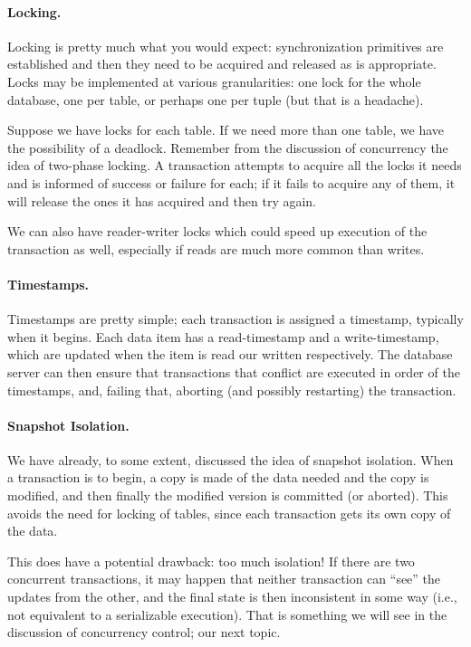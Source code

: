 \paragraph{Locking.} Locking is pretty much what you would expect: synchronization primitives are established and then they need to be acquired and released as is appropriate. Locks may be implemented at various granularities: one lock for the whole database, one per table, or perhaps one per tuple (but that is a headache). 

Suppose we have locks for each table. If we need more than one table, we have the possibility of a deadlock. Remember from the discussion of concurrency the idea of two-phase locking. A transaction attempts to acquire all the locks it needs and is informed of success or failure for each; if it fails to acquire any of them, it will release the ones it has acquired and then try again. 

We can also have reader-writer locks which could speed up execution of the transaction as well, especially if reads are much more common than writes.


\paragraph{Timestamps.}  Timestamps are pretty simple; each transaction is assigned a timestamp, typically when it begins. Each data item has a read-timestamp and a write-timestamp, which are updated when the item is read our written respectively. The database server can then ensure that transactions that conflict are executed in order of the timestamps, and, failing that, aborting (and possibly restarting) the transaction.

\paragraph{Snapshot Isolation.} We have already, to some extent, discussed the idea of snapshot isolation. When a transaction is to begin, a copy is made of the data needed and the copy is modified, and then finally the modified version is committed (or aborted). This avoids the need for locking of tables, since each transaction gets its own copy of the data.

This does have a potential drawback: too much isolation! If there are two concurrent transactions, it may happen that neither transaction can ``see'' the updates from the other, and the final state is then inconsistent in some way (i.e., not equivalent to a serializable execution). That is something we will see in the discussion of concurrency control; our next topic.





